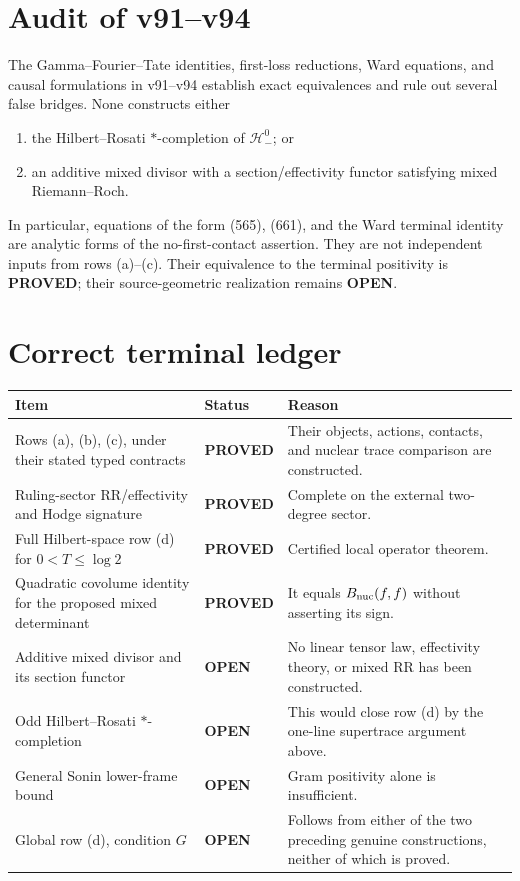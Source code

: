 \documentclass[11pt]{article}
\newcommand{\PROVED}{\textcolor{green!40!black}{\textbf{PROVED}}}
\newcommand{\OPEN}{\textcolor{red!70!black}{\textbf{OPEN}}}
\begin{document}
\section{Audit of v91--v94}

The Gamma--Fourier--Tate identities, first-loss reductions, Ward equations,
and causal formulations in v91--v94 establish exact equivalences and rule out
several false bridges.  None constructs either

\begin{enumerate}
\item the Hilbert--Rosati $*$-completion of $\mathcal H_-^0$; or
\item an additive mixed divisor with a section/effectivity functor satisfying
mixed Riemann--Roch.
\end{enumerate}

In particular, equations of the form (565), (661), and the Ward terminal
identity are analytic forms of the no-first-contact assertion.  They are not
independent inputs from rows (a)--(c).  Their equivalence to the terminal
positivity is \PROVED; their source-geometric realization remains \OPEN.

\section{Correct terminal ledger}

\begin{center}
\begin{tabular}{>{\raggedright\arraybackslash}p{.35\linewidth}
                >{\raggedright\arraybackslash}p{.16\linewidth}
                >{\raggedright\arraybackslash}p{.39\linewidth}}
\toprule
Item & Status & Reason \\
\midrule
Rows (a), (b), (c), under their stated typed contracts & \PROVED & Their
objects, actions, contacts, and nuclear trace comparison are constructed.\\
Ruling-sector RR/effectivity and Hodge signature & \PROVED & Complete on the
external two-degree sector.\\
Full Hilbert-space row (d) for $0<T\leq\log2$ & \PROVED & Certified local
operator theorem.\\
Quadratic covolume identity for the proposed mixed determinant & \PROVED & It
equals $B_{\rm nuc}(f,f)$ without asserting its sign.\\
Additive mixed divisor and its section functor & \OPEN & No linear tensor law,
effectivity theory, or mixed RR has been constructed.\\
Odd Hilbert--Rosati $*$-completion & \OPEN & This would close row (d) by the
one-line supertrace argument above.\\
General Sonin lower-frame bound & \OPEN & Gram positivity alone is
insufficient.\\
Global row (d), condition $G$ & \OPEN & Follows from either of the two
preceding genuine constructions, neither of which is proved.\\
\bottomrule
\end{tabular}
\end{center}
\end{document}
